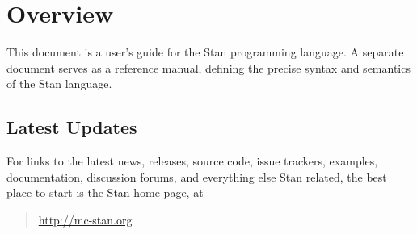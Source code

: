 \chapter{Overview}

\noindent
This document is a user's guide for the Stan programming language.
A separate document serves as a reference manual, defining the precise
syntax and semantics of the Stan language.

\section{Latest Updates}

For links to the latest news, releases, source code, issue trackers,
examples, documentation, discussion forums, and everything else Stan
related, the best place to start is the Stan home page, at
%
\begin{quote}
\url{http://mc-stan.org}
\end{quote}
